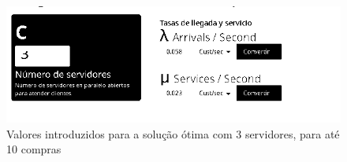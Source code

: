 \begin{figure}[<+htpb+>]
	\centering
	\includegraphics[scale=0.75]{./report/img/menos10/S3_valor.png}
	\caption{Valores introduzidos para a solução ótima com 3 servidores, para até
	10 compras}
\label{fig:figure1}
\end{figure}
